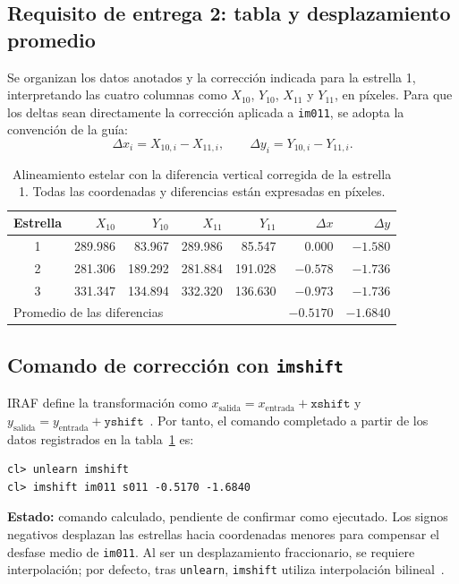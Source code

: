 \documentclass[11pt,a4paper]{article}
\begin{document}
\subsection{Requisito de entrega 2: tabla y desplazamiento promedio}
Se organizan los datos anotados y la corrección indicada para la estrella 1,
interpretando las cuatro columnas como $X_{10}$, $Y_{10}$, $X_{11}$ y $Y_{11}$, en píxeles.
Para que los deltas sean directamente la corrección aplicada a
\texttt{im011}, se adopta la convención de la guía:
\begin{equation}
\Delta x_i=X_{10,i}-X_{11,i},\qquad
\Delta y_i=Y_{10,i}-Y_{11,i}.
\label{eq:deltas}
\end{equation}

\begin{table}[htbp]
\centering
\small
\setlength{\tabcolsep}{5pt}
\caption{Alineamiento estelar con la diferencia vertical corregida de la estrella 1.
Todas las coordenadas y diferencias están expresadas en píxeles.}
\label{tab:alineamiento}
\begin{tabular}{crrrrrr}
\toprule
Estrella & $X_{10}$ & $Y_{10}$ & $X_{11}$ & $Y_{11}$
& $\Delta x$ & $\Delta y$ \\
\midrule
1 & 289.986 & 83.967  & 289.986 & 85.547  & 0.000  & $-1.580$ \\
2 & 281.306 & 189.292 & 281.884 & 191.028 & $-0.578$ & $-1.736$ \\
3 & 331.347 & 134.894 & 332.320 & 136.630 & $-0.973$ & $-1.736$ \\
\midrule
\multicolumn{5}{l}{Promedio de las diferencias}
& $-0.5170$ & $-1.6840$ \\
\bottomrule
\end{tabular}
\end{table}

\subsection{Comando de corrección con \texttt{imshift}}
IRAF define la transformación como
$x_{\mathrm{salida}}=x_{\mathrm{entrada}}+\texttt{xshift}$ y
$y_{\mathrm{salida}}=y_{\mathrm{entrada}}+\texttt{yshift}$~\cite{iraf}.
Por tanto, el comando completado a partir de los datos registrados
en la tabla~\ref{tab:alineamiento} es:
\begin{verbatim}
cl> unlearn imshift
cl> imshift im011 s011 -0.5170 -1.6840
\end{verbatim}
\textbf{Estado:} comando calculado, pendiente de confirmar como ejecutado.
Los signos negativos desplazan las estrellas hacia coordenadas menores
para compensar el desfase medio de \texttt{im011}. Al ser un desplazamiento
fraccionario, se requiere interpolación; por defecto, tras
\texttt{unlearn}, \texttt{imshift} utiliza interpolación
bilineal~\cite{iraf}.
\end{document}
